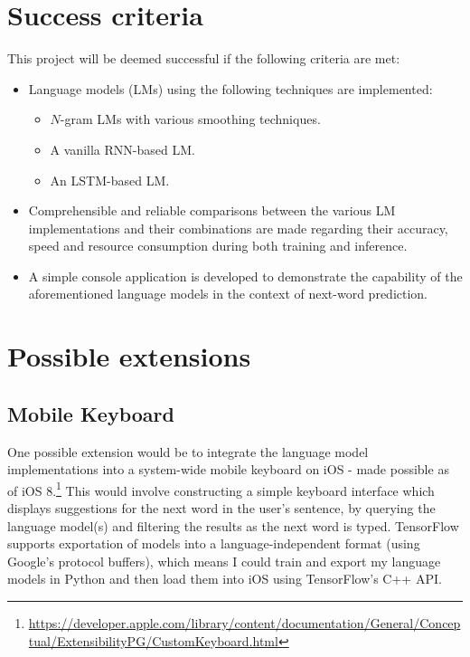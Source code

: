 \documentclass[a4paper, 12pt]{article}
\newcommand{\hlink}[2]{{\href{#1}{#2}}}
\begin{document}
\section*{Success criteria}

This project will be deemed successful if the following criteria are met:

\begin{itemize}
\item
	Language models (LMs) using the following techniques are implemented:
	\begin{itemize}
	\item
		$N$-gram LMs with various smoothing techniques.
	\item
		A vanilla RNN-based LM.
	\item
		An LSTM-based LM.
	\end{itemize}
\item
	Comprehensible and reliable comparisons between the various LM implementations and their combinations are made regarding their accuracy, speed and resource consumption during both training and inference.
\item
	A simple console application is developed to demonstrate the capability of the aforementioned language models in the context of next-word prediction.
\end{itemize}

\section*{Possible extensions}

\subsection*{Mobile Keyboard}
One possible extension would be to integrate the language model implementations into a system-wide mobile keyboard on iOS - made possible as of iOS 8.\footnote{\scriptsize{\hlink{https://developer.apple.com/library/content/documentation/General/Conceptual/ExtensibilityPG/CustomKeyboard.html}{https://developer.apple.com/library/content/documentation/General/Conceptual/ExtensibilityPG/CustomKeyboard.html}}} This would involve constructing a simple keyboard interface which displays suggestions for the next word in the user's sentence, by querying the language model(s) and filtering the results as the next word is typed. TensorFlow supports exportation of models into a language-independent format (using Google's protocol buffers), which means I could train and export my language models in Python and then load them into iOS using TensorFlow's C++ API.
\end{document}
